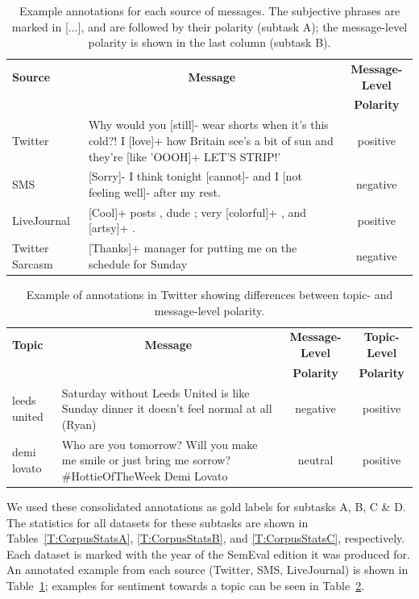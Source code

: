 \documentclass[11pt]{article}
\begin{document}
\begin{table}[t]
\small
\begin{center}
\begin{tabular}{l p{11cm} c}
\hline
\multicolumn{1}{l}{\bf Source} & \multicolumn{1}{c}{\bf Message} & \bf Message-Level \\
& & \bf Polarity \\
\hline
Twitter & Why would you [still]- wear shorts when it's this cold?!  I [love]+ how Britain see's a bit of sun and they're [like 'OOOH]+ LET'S STRIP!' & positive \\
SMS & [Sorry]- I think tonight [cannot]- and I [not feeling well]- after my rest. & negative \\
LiveJournal & [Cool]+ posts , dude ; very [colorful]+ , and [artsy]+ . & positive \\
Twitter Sarcasm & [Thanks]+ manager for putting me on the schedule for Sunday & negative \\
\hline
\end{tabular}
\caption{Example annotations for each source of messages.
        The subjective phrases are marked in [$\ldots$], and are followed by their polarity (subtask A);
        the message-level polarity is shown in the last column (subtask B).}
\label{T:Examples}
\end{center}
\end{table}

\begin{table}[t]
\small
\begin{center}
\begin{tabular}{l p{9cm} c c}
\hline
\multicolumn{1}{l}{\bf Topic} & \multicolumn{1}{c}{\bf Message} & \bf Message-Level & \bf Topic-Level \\
& & \bf Polarity & \bf Polarity \\
\hline
leeds united & Saturday without Leeds United is like Sunday dinner it doesn't feel normal at all (Ryan) & negative & positive \\
demi lovato & Who are you tomorrow? Will you make me smile or just bring me sorrow? \#HottieOfTheWeek Demi Lovato & neutral & positive \\
\hline
\end{tabular}
\caption{Example of annotations in Twitter showing differences between topic- and message-level polarity.}
\label{T:B-CExamples}
\end{center}
\end{table}

We used these consolidated annotations as gold labels for subtasks A, B, C \& D.
The statistics for all datasets for these subtasks are shown in Tables~\ref{T:CorpusStatsA}, \ref{T:CorpusStatsB}, and \ref{T:CorpusStatsC}, respectively.
Each dataset is marked with the year of the SemEval edition it was produced for.
An annotated example from each source (Twitter, SMS, LiveJournal)
is shown in Table~\ref{T:Examples};
examples for sentiment towards a topic can be seen in Table~\ref{T:B-CExamples}.
\end{document}
